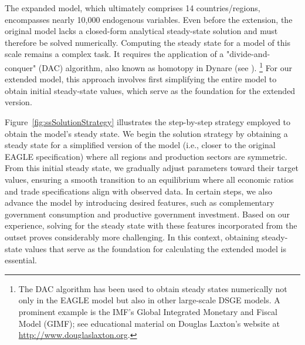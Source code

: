 \documentclass[a4paper,11pt]{article}
\numberwithin{equation}{section}
\begin{document}
The expanded model, which ultimately comprises 14 countries/regions, encompasses nearly 10,000 endogenous variables.
Even before the extension, the original model lacks a closed-form analytical steady-state solution and must therefore be solved numerically.
Computing the steady state for a model of this scale remains a complex task.
It requires the application of a "divide-and-conquer" (DAC) algorithm, also known as homotopy in Dynare (see \citet{Adjemianetal2024}).
\footnote{
    The DAC algorithm has been used to obtain steady states numerically not only in the EAGLE model but also in other large-scale DSGE models. A prominent example is the IMF's Global Integrated Monetary and Fiscal Model (GIMF); see educational material on Douglas Laxton's website at \url{http://www.douglaslaxton.org}.
}
For our extended model, this approach involves first simplifying the entire model to obtain initial steady-state values, which serve as the foundation for the extended version.

Figure~\ref{fig:ssSolutionStrategy} illustrates the step-by-step strategy employed to obtain the model's steady state.
We begin the solution strategy by obtaining a steady state for a simplified version of the model (i.e., closer to the original EAGLE specification) where all regions and production sectors are symmetric. 
From this initial steady state, we gradually adjust parameters toward their target values, ensuring a smooth transition to an equilibrium where all economic ratios and trade specifications align with observed data.
In certain steps, we also advance the model by introducing desired features, such as complementary government consumption and productive government investment.
Based on our experience, solving for the steady state with these features incorporated from the outset proves considerably more challenging.
In this context, obtaining steady-state values that serve as the foundation for calculating the extended model is essential.
\end{document}
